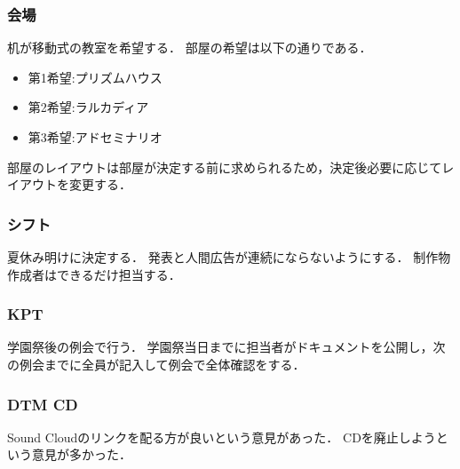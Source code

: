 \subsubsection{会場}
机が移動式の教室を希望する．
部屋の希望は以下の通りである．
\begin{itemize}
    \item 第1希望:プリズムハウス
    \item 第2希望:ラルカディア
    \item 第3希望:アドセミナリオ  
\end{itemize}
部屋のレイアウトは部屋が決定する前に求められるため，決定後必要に応じてレイアウトを変更する．
    
\subsubsection{シフト}
夏休み明けに決定する．
発表と人間広告が連続にならないようにする．
制作物作成者はできるだけ担当する．

\subsubsection{KPT}
学園祭後の例会で行う．
学園祭当日までに担当者がドキュメントを公開し，次の例会までに全員が記入して例会で全体確認をする．

\subsubsection{DTM CD}
Sound Cloudのリンクを配る方が良いという意見があった．
CDを廃止しようという意見が多かった．